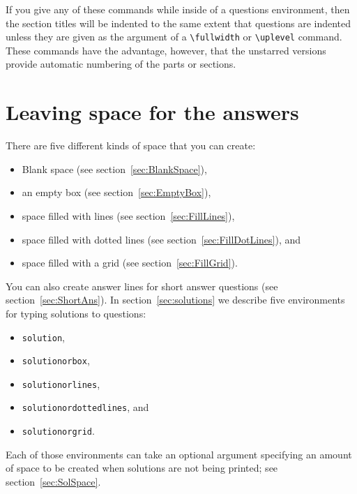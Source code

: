 \documentclass[12pt]{exam}
\makeatletter
\newcommand{\indc}[1]{\index{#1@\texttt{\char`\\#1}}}
\makeatother
\begin{document}
If you give any of these commands while inside of a questions
environment, then the section titles will be indented to the same
extent that questions are indented unless they are given as the
argument of a \verb"\fullwidth"\indc{fullwidth} or
\verb"\uplevel"\indc{uplevel} command.  These commands have the
advantage, however, that the unstarred versions provide automatic
numbering of the parts or sections.




\section{Leaving space for the answers}
\label{sec:LeaveSpace}

There are five different kinds of space that you can create:
\begin{itemize}
\item Blank space (see section~\ref{sec:BlankSpace}),
\item an empty box (see section~\ref{sec:EmptyBox}),
\item space filled with lines (see section~\ref{sec:FillLines}),
\item space filled with dotted lines (see
  section~\ref{sec:FillDotLines}), and
\item space filled with a grid (see section~\ref{sec:FillGrid}).
\end{itemize}
You can also create answer lines for short answer questions (see
section~\ref{sec:ShortAns}).
In section~\ref{sec:solutions} we describe five environments for
typing solutions to questions:
\begin{itemize}
\item \texttt{solution},
\item \texttt{solutionorbox},
\item \texttt{solutionorlines},
\item \texttt{solutionordottedlines}, and
\item \texttt{solutionorgrid}.
\end{itemize}
Each of those environments can take an optional argument specifying an
amount of space to be created when solutions are not being printed;
see section~\ref{sec:SolSpace}.


\end{document}
